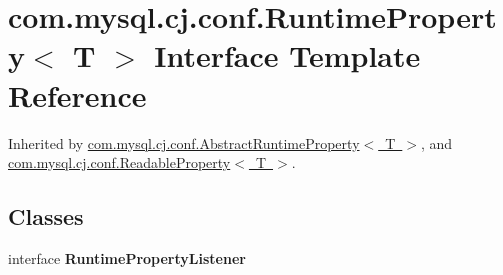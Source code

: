 \hypertarget{interfacecom_1_1mysql_1_1cj_1_1conf_1_1_runtime_property}{}\section{com.\+mysql.\+cj.\+conf.\+Runtime\+Property$<$ T $>$ Interface Template Reference}
\label{interfacecom_1_1mysql_1_1cj_1_1conf_1_1_runtime_property}


Inherited by \mbox{\hyperlink{classcom_1_1mysql_1_1cj_1_1conf_1_1_abstract_runtime_property}{com.\+mysql.\+cj.\+conf.\+Abstract\+Runtime\+Property$<$ T $>$}}, and \mbox{\hyperlink{interfacecom_1_1mysql_1_1cj_1_1conf_1_1_readable_property}{com.\+mysql.\+cj.\+conf.\+Readable\+Property$<$ T $>$}}.

\subsection*{Classes}
\begin{DoxyCompactItemize}
\item 
interface {\bfseries Runtime\+Property\+Listener}
\end{DoxyCompactItemize}
